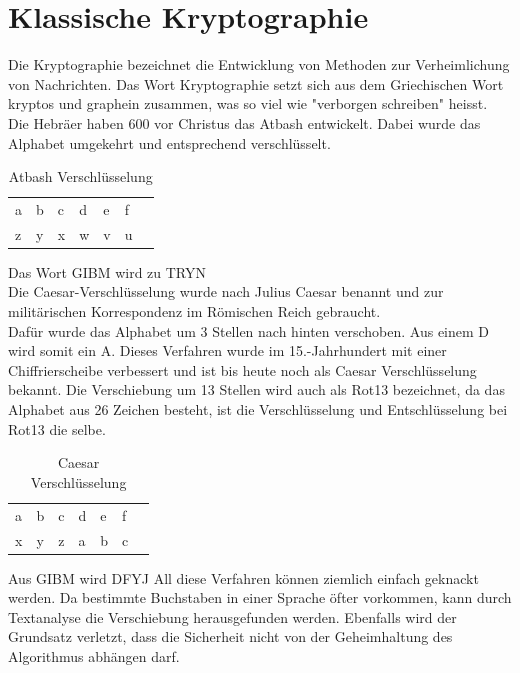 \section{Klassische Kryptographie}
Die Kryptographie bezeichnet die Entwicklung von Methoden zur Verheimlichung von Nachrichten. Das Wort Kryptographie setzt sich aus dem Griechischen Wort kryptos und graphein zusammen, was so viel wie "verborgen schreiben" heisst.  \\
Die Hebräer haben 600 vor Christus das Atbash entwickelt. Dabei wurde das Alphabet umgekehrt und entsprechend verschlüsselt.
%
\begin{table}[ht]
\caption{Atbash Verschlüsselung}
\begin{center}
\begin{tabular}{|l|l|l|l|l|l|l|}
  a & b & c & d & e & f\\
  z & y & x & w & v & u\\
\end{tabular}
\end{center}
\end{table}
%
Das Wort GIBM wird zu TRYN\\
Die Caesar-Verschlüsselung wurde nach Julius Caesar benannt und zur militärischen Korrespondenz im Römischen Reich gebraucht.\\
Dafür wurde das Alphabet um 3 Stellen nach hinten verschoben. Aus einem D wird somit ein A. Dieses Verfahren wurde im 15.-Jahrhundert mit einer Chiffrierscheibe verbessert und ist bis heute noch als Caesar Verschlüsselung bekannt. Die Verschiebung um 13 Stellen wird auch als Rot13 bezeichnet, da das Alphabet aus 26 Zeichen besteht, ist die Verschlüsselung und Entschlüsselung bei Rot13 die selbe.

\begin{table}[ht]
\caption{Caesar Verschlüsselung}
\begin{center}
\begin{tabular}{|l|l|l|l|l|l|l|}
  a & b & c & d & e & f\\
  x & y & z & a & b & c\\
\end{tabular}
\end{center}
\end{table}
Aus GIBM wird DFYJ
%
All diese Verfahren können ziemlich einfach geknackt werden. Da bestimmte Buchstaben in einer Sprache öfter vorkommen, kann durch Textanalyse die Verschiebung herausgefunden werden. Ebenfalls wird der Grundsatz verletzt, dass die Sicherheit nicht von der Geheimhaltung des Algorithmus abhängen darf. 
%
%
